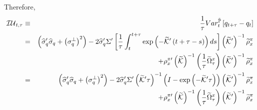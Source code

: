 \documentclass{article}
\begin{document}
Therefore, 
\begin{eqnarray*}
\mathcal{IU}_{t,\tau } &\equiv &\frac{1}{\tau }Var_{t}^{\mathbb{\tilde{P}}}%
\left[ q_{t+\tau }-q_{t}\right]  \\
&=&\left( \widehat{\sigma }_{q}^{\prime }\widehat{\sigma }_{q}+\left( \sigma
_{q}^{\bot }\right) ^{2}\right) -2\widehat{\sigma }_{q}^{\prime }\Sigma
^{\prime }\left[ \frac{1}{\tau }\int_{t}^{t+\tau }\exp \left( -\widetilde{%
\mathcal{K}}^{\prime }\left( t+\tau -s\right) \right) ds\right] \left( 
\widetilde{\mathcal{K}}^{\prime }\right) ^{-1}\widetilde{\rho }_{x}^{\pi } \\
&&+\rho _{x}^{\pi \prime }\left( \widetilde{\mathcal{K}}\right) ^{-1}\left( 
\frac{1}{\tau }\widetilde{\Omega }_{\tau }^{x}\right) \left( \widetilde{%
\mathcal{K}}^{\prime }\right) ^{-1}\widetilde{\rho }_{x}^{\pi } \\
&=&\left( \widehat{\sigma }_{q}^{\prime }\widehat{\sigma }_{q}+\left( \sigma
_{q}^{\bot }\right) ^{2}\right) -2\widehat{\sigma }_{q}^{\prime }\Sigma
^{\prime }\left( \widetilde{\mathcal{K}}^{\prime }\tau \right) ^{-1}\left(
I-\exp \left( -\widetilde{\mathcal{K}}^{\prime }\tau \right) \right) \left( 
\widetilde{\mathcal{K}}^{\prime }\right) ^{-1}\widetilde{\rho }_{x}^{\pi } \\
&&+\rho _{x}^{\pi \prime }\left( \widetilde{\mathcal{K}}\right) ^{-1}\left( 
\frac{1}{\tau }\widetilde{\Omega }_{\tau }^{x}\right) \left( \widetilde{%
\mathcal{K}}^{\prime }\right) ^{-1}\widetilde{\rho }_{x}^{\pi }
\end{eqnarray*}
\end{document}
